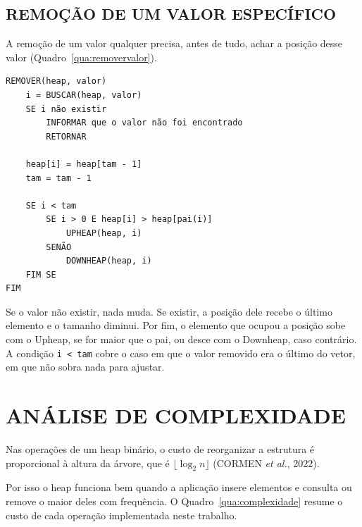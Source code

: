 \documentclass[12pt,openany,oneside,a4paper,english,brazil,sumario=tradicional]{abntex2}
\begin{document}
\section{REMOÇÃO DE UM VALOR ESPECÍFICO}

A remoção de um valor qualquer precisa, antes de tudo, achar a posição desse valor (Quadro~\ref{qua:removervalor}).

\begin{quadro}[htb]
\caption{\label{qua:removervalor}Pseudocódigo da remoção de um valor específico}
\begin{Verbatim}
REMOVER(heap, valor)
    i = BUSCAR(heap, valor)
    SE i não existir
        INFORMAR que o valor não foi encontrado
        RETORNAR

    heap[i] = heap[tam - 1]
    tam = tam - 1

    SE i < tam
        SE i > 0 E heap[i] > heap[pai(i)]
            UPHEAP(heap, i)
        SENÃO
            DOWNHEAP(heap, i)
    FIM SE
FIM
\end{Verbatim}
\end{quadro}

Se o valor não existir, nada muda. Se existir, a posição dele recebe o último elemento e o tamanho diminui. Por fim, o elemento que ocupou a posição sobe com o Upheap, se for maior que o pai, ou desce com o Downheap, caso contrário. A condição \texttt{i < tam} cobre o caso em que o valor removido era o último do vetor, em que não sobra nada para ajustar.

\chapter{ANÁLISE DE COMPLEXIDADE}

Nas operações de um heap binário, o custo de reorganizar a estrutura é proporcional à altura da árvore, que é $\lfloor \log_2 n \rfloor$ (CORMEN \emph{et al.}, 2022).

Por isso o heap funciona bem quando a aplicação insere elementos e consulta ou remove o maior deles com frequência. O Quadro~\ref{qua:complexidade} resume o custo de cada operação implementada neste trabalho.
\end{document}
